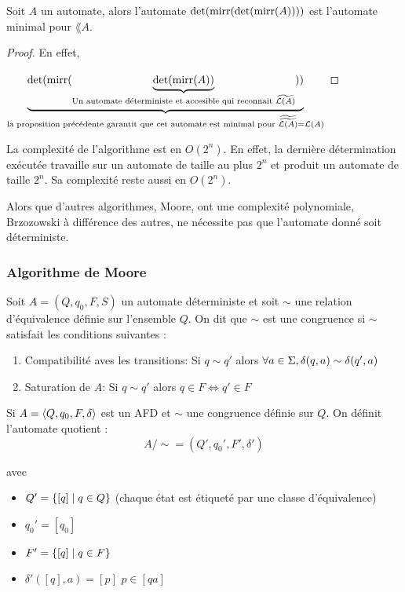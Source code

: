 \begin{coro}
	Soit $A$ un automate, alors l'automate $\text{det} (\text{mirr} (\text{det}(\text{mirr} (A))))$ est l'automate minimal pour $\lang A$.
\end{coro}

\begin{proof}
	En effet,

	$\underbrace{\text{det} (\text{mirr} (
			\underbrace{\text{det}(\text{mirr} (A))}_{\text{Un automate déterministe et accesible qui reconnait }\widetilde{\mathcal{L}\left(A\right)}}
			))}_{\text{la proposition précédente garantit que cet automate est minimal pour }  \widetilde{\widetilde{\mathcal{L}\left(A\right)} } = \mathcal{L}\left(A\right)}
	$
\end{proof}

\begin{complexite}
	La complexité de l'algorithme est en $O(2^n)$. En effet, la dernière détermination exécutée travaille sur un automate de taille au plus $2^n$
	et produit un automate de taille $2^n$. Sa complexité reste aussi en $O(2^n)$.
\end{complexite}


\begin{remarque}
	Alors que d'autres algorithmes, \tq Moore, ont une complexité polynomiale, Brzozowski à différence des autres, ne nécessite pas
	que l'automate donné soit déterministe.
\end{remarque}

\subsubsection{Algorithme de Moore}


\begin{definition}
	Soit $A = (Q,q_0,F,S)$ un automate déterministe et soit $\sim$ une relation d'équivalence définie sur l'ensemble $Q$. On dit que
	$\sim$ est une congruence si $\sim$ satisfait les conditions suivantes :
	\begin{enumerate}
		\item Compatibilité aves les transitions: Si $q \sim q'$ alors $\forall a \in \Sigma, \delta (q,a) \sim \delta (q',a)$
		\item Saturation de $A$: Si $q \sim q'$ alors $q \in F \iff q' \in F$
	\end{enumerate}
\end{definition}


\begin{definition}
	Si $A = \langle Q, q_0, F, \delta \rangle$ est un AFD et $\sim$ une congruence définie sur $Q$. On définit l'automate quotient :
	$$ A/\sim = (Q',q_0',F',\delta') $$

	avec \begin{itemize}
		\item $Q' = \left\{[q] \mid q\in Q\right\}$ (chaque état est étiqueté par une classe d'équivalence)
		\item $q_0' = [q_0]$
		\item $F' =\left\{[q] \mid q \in F\right\}$
		\item $\delta'([q], a) = [p]$ \ssi $p \in [qa]$
	\end{itemize}

\end{definition}

